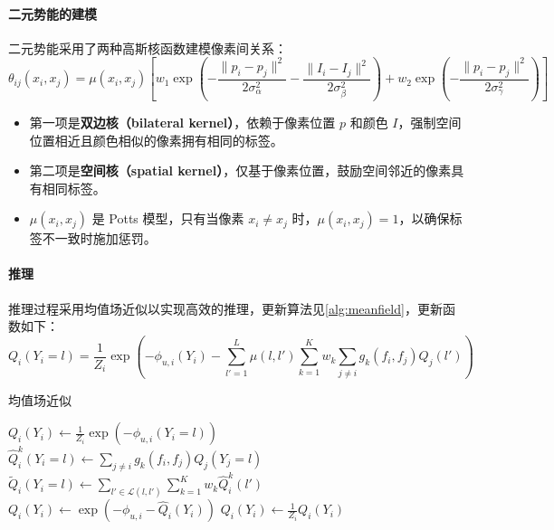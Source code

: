 \documentclass[a4paper,12pt]{ctexart}
\begin{document}
\paragraph{二元势能的建模}
    二元势能采用了两种高斯核函数建模像素间关系：
    $$
    \theta_{ij}(x_i, x_j) = \mu(x_i, x_j) \left[ w_1 \exp \left( -\frac{\|p_i - p_j\|^2}{2\sigma_\alpha^2} - \frac{\|I_i - I_j\|^2}{2\sigma_\beta^2} \right) + w_2 \exp \left( -\frac{\|p_i - p_j\|^2}{2\sigma_\gamma^2} \right) \right]
    $$
    \begin{itemize}
    \item 第一项是\textbf{双边核（bilateral kernel）}，依赖于像素位置 $p$ 和颜色 $I$，强制空间位置相近且颜色相似的像素拥有相同的标签。
    \item 第二项是\textbf{空间核（spatial kernel）}，仅基于像素位置，鼓励空间邻近的像素具有相同标签。
    \item $\mu(x_i, x_j)$ 是 Potts 模型，只有当像素 $x_i \neq x_j$ 时，$\mu(x_i, x_j) = 1$，以确保标签不一致时施加惩罚。
    \end{itemize}

\paragraph{推理}
推理过程采用均值场近似以实现高效的推理，更新算法见\ref{alg:meanfield}，更新函数如下：
$$
Q_i(Y_i = l) = \frac{1}{Z_i} \exp \left( -\phi_{u,i}(Y_i) - \sum_{l' = 1}^{L} \mu(l, l') \sum_{k=1}^{K} w_k \sum_{j \neq i} g_k(f_i, f_j) Q_j(l') \right)
$$
\begin{algorithm}
    \caption{均值场近似}
    \label{alg:meanfield}
    \begin{algorithmic}[1]
    \STATE $Q_i(Y_i) \leftarrow \frac{1}{Z_i} \exp\left(-\phi_{u,i}(Y_i = l)\right)$ 
        \STATE $\hat{Q}_i^k(Y_i = l) \leftarrow \sum_{j \neq i} g_k(f_i, f_j) Q_j(Y_j = l)$ 
        \STATE $\tilde{Q}_i(Y_i = l) \leftarrow \sum_{l' \in \mathcal{L}(l, l')} \sum_{k=1}^{K} w_k \hat{Q}_i^k(l')$ 
        \STATE $Q_i(Y_i) \leftarrow \exp\left(-\phi_{u,i} - \hat{Q}_i(Y_i)\right)$ 
        \STATE $Q_i(Y_i) \leftarrow \frac{1}{Z_i} Q_i(Y_i)$ 
    \ENDWHILE
    \end{algorithmic}
\end{algorithm}
\end{document}
